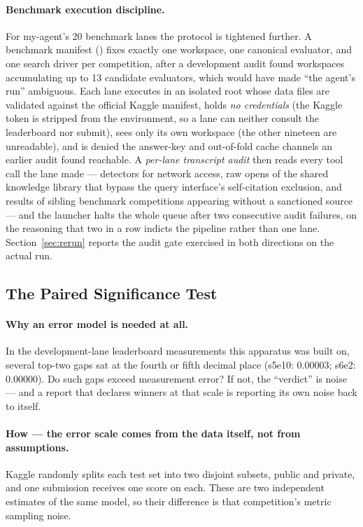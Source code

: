 \documentclass[11pt,a4paper]{article}
\begin{document}
\paragraph{Benchmark execution discipline.} For my-agent's 20 benchmark lanes the protocol is
tightened further. A benchmark manifest () fixes exactly one
workspace, one canonical evaluator, and one search driver per competition, after a development
audit found workspaces accumulating up to 13 candidate evaluators, which would have made ``the
agent's run'' ambiguous. Each lane executes in an isolated root whose data files are validated
against the official Kaggle manifest, holds \emph{no credentials} (the Kaggle token is stripped
from the environment, so a lane can neither consult the leaderboard nor submit), sees only its
own workspace (the other nineteen are unreadable), and is denied the answer-key and
out-of-fold cache channels an earlier audit found reachable. A \emph{per-lane transcript
audit} then reads every tool call the lane made --- detectors for network access, raw opens of
the shared knowledge library that bypass the query interface's self-citation exclusion, and
results of sibling benchmark competitions appearing without a sanctioned source --- and the
launcher halts the whole queue after two consecutive audit failures, on the reasoning that two
in a row indicts the pipeline rather than one lane. Section~\ref{sec:rerun} reports the audit
gate exercised in both directions on the actual run.

\subsection{The Paired Significance Test}
\label{sec:exp2}

\paragraph{Why an error model is needed at all.} In the development-lane leaderboard
measurements this apparatus was built on, several top-two gaps sat at the fourth or fifth
decimal place (s5e10: $0.00003$; s6e2: $0.00000$). Do such gaps exceed measurement error? If
not, the ``verdict'' is noise --- and a report that declares winners at that scale is
reporting its own noise back to itself.

\paragraph{How --- the error scale comes from the data itself, not from assumptions.} Kaggle randomly splits each test set into two disjoint subsets, public and private, and one submission receives one score on each. These are two independent estimates of the same model, so their difference is that competition's metric sampling noise.
\end{document}
